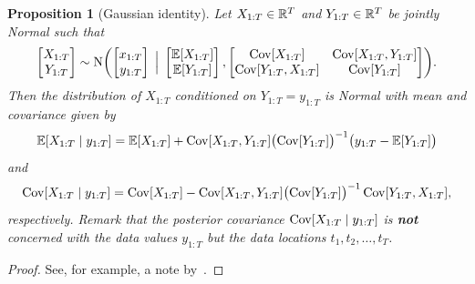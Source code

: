 \documentclass[]{article}
\newtheorem{proposition}[theorem]{Proposition}
\begin{document}
\begin{proposition}[Gaussian identity]
	\label{prop:gaussian-identity}
	Let $X_{1:T}\in\mathbb{R}^{T}$ and $Y_{1:T} \in \mathbb{R}^T$ be jointly Normal such that
	\begin{equation*}
		\begin{bmatrix}
			X_{1:T} \\
			Y_{1:T}
		\end{bmatrix}
		\sim
		\mathrm{N}\biggl(
		\begin{bmatrix}
			x_{1:T} \\
			y_{1:T}
		\end{bmatrix}
		\condBig
		\begin{bmatrix}
			\expec{X_{1:T}} \\
			\expec{Y_{1:T}}
		\end{bmatrix}, 
		\begin{bmatrix}
			\cov{X_{1:T}} & \cov{X_{1:T}, Y_{1:T}} \\
			\cov{Y_{1:T}, X_{1:T}} & \cov{Y_{1:T}}
		\end{bmatrix}
		\biggr).
	\end{equation*}
	Then the distribution of $X_{1:T}$ conditioned on $Y_{1:T}=y_{1:T}$ is Normal with mean and covariance given by
	\begin{equation*}
		\expec{X_{1:T} \cond y_{1:T}} = \expec{X_{1:T}} + \cov{X_{1:T}, Y_{1:T}} \bigl(\cov{Y_{1:T}}\bigr)^{-1}\bigl(y_{1:T} - \expec{Y_{1:T}}\bigr)
	\end{equation*}
	and
	\begin{equation*}
		\cov{X_{1:T} \cond y_{1:T}} = \cov{X_{1:T}} - \cov{X_{1:T}, Y_{1:T}} \bigl(\cov{Y_{1:T}}\bigr)^{-1}\cov{Y_{1:T}, X_{1:T}},
	\end{equation*}
	respectively. Remark that the posterior covariance $\cov{X_{1:T} \cond y_{1:T}}$ is \textbf{not} concerned with the data values $y_{1:T}$ but the data locations $t_1, t_2, \ldots, t_T$.
\end{proposition}
\begin{proof}
	See, for example, a note by~\cite{Schon2011}.
\end{proof}
\end{document}

